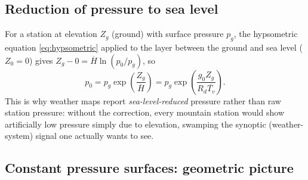 \documentclass[11pt]{article}
\newcommand{\Rd}{R_d}
\begin{document}
\subsection{Reduction of pressure to sea level}
For a station at elevation $Z_g$ (ground) with surface pressure $p_g$, the hypsometric equation \eqref{eq:hypsometric} applied to the layer between the ground and sea level ($Z_0=0$) gives $Z_g - 0 = \overline{H}\ln(p_0/p_g)$, so
\begin{equation}
p_0 = p_g\exp\!\left(\frac{Z_g}{\overline H}\right) = p_g \exp\!\left(\frac{g_0 Z_g}{\Rd \overline{T_v}}\right).
\label{eq:sealevelreduction}
\end{equation}
This is why weather maps report \emph{sea-level-reduced} pressure rather than raw station pressure: without the correction, every mountain station would show artificially low pressure simply due to elevation, swamping the synoptic (weather-system) signal one actually wants to see.

\subsection{Constant pressure surfaces: geometric picture}
\end{document}
